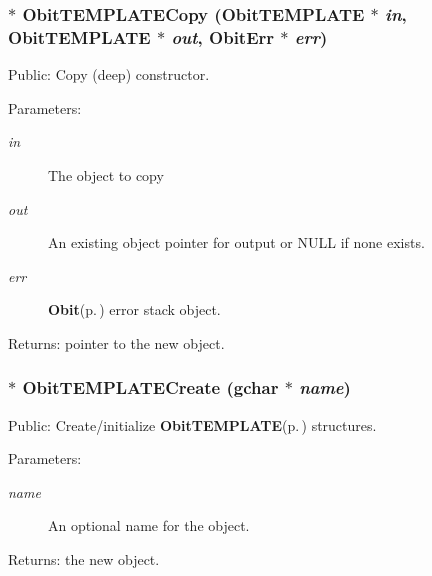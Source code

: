 \subsubsection{$\ast$ Obit\-TEMPLATECopy ({\bf Obit\-TEMPLATE} $\ast$ {\em in}, {\bf Obit\-TEMPLATE} $\ast$ {\em out}, {\bf Obit\-Err} $\ast$ {\em err})}\label{ObitTEMPLATE_8c_a8}


Public: Copy (deep) constructor. 

\begin{Desc}
\item[Parameters:]
\begin{description}
\item[{\em in}]The object to copy \item[{\em out}]An existing object pointer for output or NULL if none exists. \item[{\em err}]{\bf Obit}{\rm (p.\,\pageref{structObit})} error stack object. \end{description}
\end{Desc}
\begin{Desc}
\item[Returns:]pointer to the new object. \end{Desc}
\subsubsection{$\ast$ Obit\-TEMPLATECreate (gchar $\ast$ {\em name})}\label{ObitTEMPLATE_8c_a10}


Public: Create/initialize {\bf Obit\-TEMPLATE}{\rm (p.\,\pageref{structObitTEMPLATE})} structures. 

\begin{Desc}
\item[Parameters:]
\begin{description}
\item[{\em name}]An optional name for the object. \end{description}
\end{Desc}
\begin{Desc}
\item[Returns:]the new object. \end{Desc}
